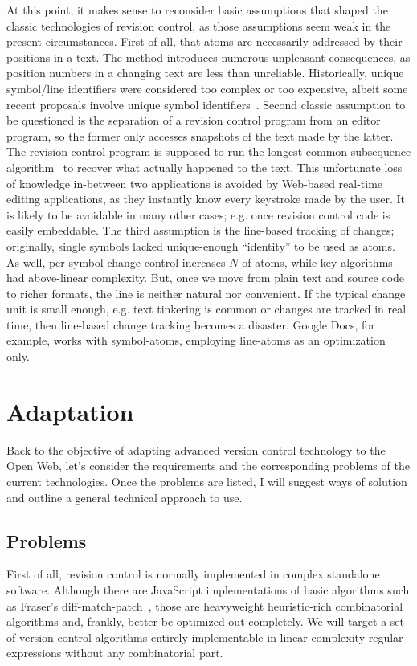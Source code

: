 \documentclass{acm_proc_article-sp}
\begin{document}
At this point, it makes sense to reconsider basic assumptions that shaped the classic technologies of revision control, as those assumptions seem weak in the present circumstances. 
First of all, that atoms are necessarily addressed by their positions in a text.
The method introduces numerous unpleasant consequences, as position numbers in a changing text are less than unreliable. 
Historically, unique symbol/line identifiers were considered too complex or too expensive, albeit some recent proposals involve unique symbol identifiers~\cite{woot}.
Second classic assumption to be questioned is the separation of a revision control program from an editor program, so the former only accesses snapshots of the text made by the latter.
The revision control program is supposed to run the longest common subsequence algorithm~\cite{lcs-algo} to recover what actually happened to the text.
This unfortunate loss of knowledge in-between two applications is avoided by Web-based real-time editing applications, as they instantly know every keystroke made by the user.
It is likely to be avoidable in many other cases; e.g. once revision control code is easily embeddable.
The third assumption is the line-based tracking of changes; originally, single symbols lacked unique-enough ``identity'' to be used as atoms.
As well, per-symbol change control increases $N$ of atoms, while key algorithms had above-linear complexity.
But, once we move from plain text and source code to richer formats, the line is neither natural nor convenient.
If the typical change unit is small enough, e.g. text tinkering is common or changes are tracked in real time, then line-based change tracking becomes a disaster.
Google Docs, for example, works with symbol-atoms, employing line-atoms as an optimization only.


\section {Adaptation}   \label{sec:textile}

Back to the objective of adapting advanced version control technology to the Open Web, let's consider the requirements and the corresponding problems of the current technologies. 
Once the problems are listed, I will suggest ways of solution and outline a general technical approach to use.

\subsection {Problems}
First of all, revision control is normally implemented
in complex standalone software. Although there are JavaScript
implementations of basic algorithms such as Fraser's
diff-match-patch~\cite{diff-match-patch}, those are
heavyweight heuristic-rich combinatorial
algorithms and, frankly, better be optimized out
completely. We will target a set of version control
algorithms entirely implementable in 
linear-complexity regular
expressions without any combinatorial part.
\end{document}
